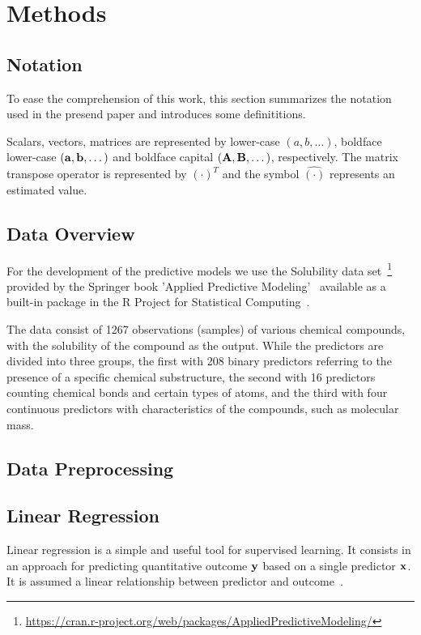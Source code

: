 \section{Methods}

\subsection{Notation}
To ease the comprehension of this work, this section summarizes the notation used in the presend paper and introduces some definititions.

Scalars, vectors, matrices are represented by lower-case $(a, b, \dots)$, boldface lower-case $({\bf a}, {\bf b}, \dots)$ and boldface capital $({\bf A}, {\bf B}, \dots)$, respectively. The matrix transpose operator is represented by $(\cdot)^T$ and the symbol $\hat{(\cdot)}$ represents an estimated value.

\subsection{Data Overview}
For the development of the predictive models we use the Solubility data set~\footnote{\url{https://cran.r-project.org/web/packages/AppliedPredictiveModeling/}} provided by the Springer book 'Applied Predictive Modeling'~\cite{Kuhn2013} available as a built-in package in the R Project for Statistical Computing~\cite{Rproject2022}. 

The data consist of 1267 observations (samples) of various chemical compounds, with the solubility of the compound as the output. While the predictors are divided into three groups, the first with 208 binary predictors referring to the presence of a specific chemical substructure, the second with 16 predictors counting chemical bonds and certain types of atoms, and the third with four continuous predictors with characteristics of the compounds, such as molecular mass.

\subsection{Data Preprocessing}



\subsection{Linear Regression}
Linear regression is a simple and useful tool for supervised learning. It consists in an approach for predicting  quantitative outcome ${\bf y}$ based on a single predictor ${\bf x}$. It is assumed a linear relationship between predictor and outcome~\cite{James2013}.

